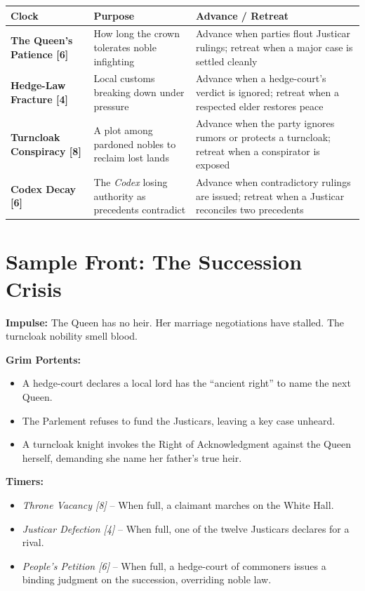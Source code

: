 \documentclass[11pt,twoside]{book}
\begin{document}
\begin{longtable}{@{}p{2.5cm}p{4cm}p{5cm}@{}}
\toprule
\textbf{Clock} & \textbf{Purpose} & \textbf{Advance / Retreat} \\
\midrule
\endhead
\textbf{The Queen's Patience [6]} & How long the crown tolerates noble infighting & Advance when parties flout Justicar rulings; retreat when a major case is settled cleanly \\
\addlinespace
\textbf{Hedge-Law Fracture [4]} & Local customs breaking down under pressure & Advance when a hedge-court's verdict is ignored; retreat when a respected elder restores peace \\
\addlinespace
\textbf{Turncloak Conspiracy [8]} & A plot among pardoned nobles to reclaim lost lands & Advance when the party ignores rumors or protects a turncloak; retreat when a conspirator is exposed \\
\addlinespace
\textbf{Codex Decay [6]} & The \textit{Codex} losing authority as precedents contradict & Advance when contradictory rulings are issued; retreat when a Justicar reconciles two precedents \\
\bottomrule
\end{longtable}

\section{Sample Front: The Succession Crisis}

\textbf{Impulse:} The Queen has no heir. Her marriage negotiations have stalled. The turncloak nobility smell blood.

\textbf{Grim Portents:}
\begin{itemize}
    \item A hedge-court declares a local lord has the ``ancient right'' to name the next Queen.
    \item The Parlement refuses to fund the Justicars, leaving a key case unheard.
    \item A turncloak knight invokes the Right of Acknowledgment against the Queen herself, demanding she name her father's true heir.
\end{itemize}

\textbf{Timers:}
\begin{itemize}
    \item \textit{Throne Vacancy [8]} -- When full, a claimant marches on the White Hall.
    \item \textit{Justicar Defection [4]} -- When full, one of the twelve Justicars declares for a rival.
    \item \textit{People's Petition [6]} -- When full, a hedge-court of commoners issues a binding judgment on the succession, overriding noble law.
\end{itemize}
\end{document}
